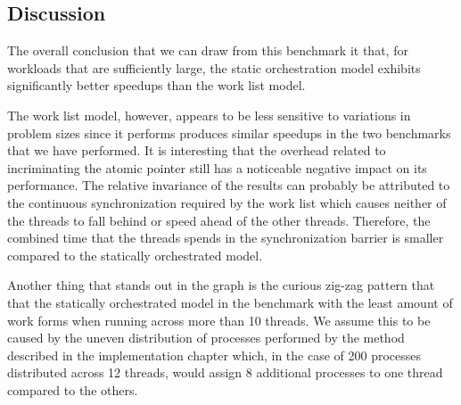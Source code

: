 \subsection{Discussion}
The overall conclusion that we can draw from this benchmark it that,
for workloads that are sufficiently large, the static orchestration
model exhibits significantly better speedups than the work list
model.

The work list model, however, appears to be less sensitive to
variations in problem sizes since it performs produces similar
speedups in the two benchmarks that we have performed. It is
interesting that the overhead related to incriminating the atomic
pointer still has a noticeable negative impact on its performance. The
relative invariance of the results can probably be attributed to the
continuous synchronization required by the work list which causes
neither of the threads to fall behind or speed ahead of the other
threads. Therefore, the combined time that the threads spends in the
synchronization barrier is smaller compared to the statically
orchestrated model.



Another thing that stands out in the graph is the curious zig-zag
pattern that that the statically orchestrated model in the benchmark
with the least amount of work forms when running across more than 10
threads. We assume this to be caused by the uneven distribution of
processes performed by the method described in the implementation
chapter which, in the case of 200 processes distributed across 12 threads,
would assign 8 additional processes to one thread compared to the
others.




